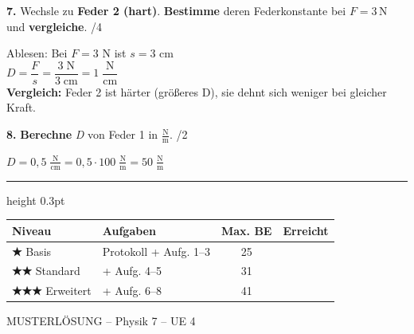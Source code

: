 \documentclass[10pt,a4paper]{article}
\newcommand{\lsg}[1]{\textcolor{loesung}{\textbf{#1}}}
\newcommand{\punkte}[1]{\hfill\textcolor{grau}{\small/#1}}
\newcommand{\stern}[1]{\textcolor{physik}{\textbf{#1}}}
\newcommand{\fv}[1]{\textit{#1}}
\newcommand{\op}[1]{\textbf{#1}}
\newcommand{\rechenplatzlsg}[1]{\vspace{2mm}\textcolor{loesung}{#1}\vspace{6mm}}
\begin{document}
\textbf{7.} Wechsle zu \textbf{Feder 2 (hart)}. \op{Bestimme} deren Federkonstante bei $\fv{F} = 3$\,N und \op{vergleiche}. \punkte{4}

\rechenplatzlsg{%
Ablesen: Bei $F = 3$ N ist $s = 3$ cm\\[2mm]
$D = \dfrac{F}{s} = \dfrac{3\;\text{N}}{3\;\text{cm}} = 1\;\dfrac{\text{N}}{\text{cm}}$\\[2mm]
\textbf{Vergleich:} Feder 2 ist härter (größeres D), sie dehnt sich weniger bei gleicher Kraft.
}

\textbf{8.} \op{Berechne} \fv{D} von Feder 1 in $\frac{\text{N}}{\text{m}}$. \; \punkte{2}

\vspace{2mm}

\lsg{$D = 0{,}5\;\frac{\text{N}}{\text{cm}} = 0{,}5 \cdot 100\;\frac{\text{N}}{\text{m}} = 50\;\frac{\text{N}}{\text{m}}$}

\vspace{6mm}

\vfill

\hrule height 0.3pt
\vspace{2mm}

{\small
\begin{tabular}{|l|l|c|c|}
\hline
\rowcolor{hellgrau}
\textbf{Niveau} & \textbf{Aufgaben} & \textbf{Max. BE} & \textbf{Erreicht} \\
\hline
\stern{★} Basis & Protokoll + Aufg. 1–3 & 25 & \\
\hline
\stern{★★} Standard & + Aufg. 4–5 & 31 & \\
\hline
\stern{★★★} Erweitert & + Aufg. 6–8 & 41 & \\
\hline
\end{tabular}
\hfill
\textcolor{loesung}{\footnotesize MUSTERLÖSUNG – Physik 7 – UE 4}
}
\end{document}
